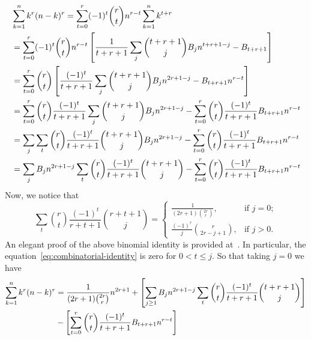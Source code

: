 \begin{equation*}
    \begin{split}
        &\sum_{k=1}^{n} k^{r} (n-k)^{r}
        = \sum_{t=0}^{r} (-1)^t \binom{r}{t} n^{r-t} \sum_{k=1}^{n} k^{t+r} \\
        &= \sum_{t=0}^{r} (-1)^t \binom{r}{t} n^{r-t} \left[ \frac{1}{t+r+1} \sum_{j} \binom{t+r+1}{j} {B}\sb{j} n^{t+r+1-j} - {B}\sb{t+r+1} \right] \\
        &= \sum_{t=0}^{r} \binom{r}{t} \left[ \frac{(-1)^t}{t+r+1} \sum_{j} \binom{t+r+1}{j} {B}\sb{j} n^{2r+1-j} - {B}\sb{t+r+1} n^{r-t} \right] \\
        &= \sum_{t=0}^{r} \binom{r}{t} \frac{(-1)^t}{t+r+1} \sum_{j} \binom{t+r+1}{j} {B}\sb{j} n^{2r+1-j} - \sum_{t=0}^{r} \binom{r}{t} \frac{(-1)^t}{t+r+1} {B}\sb{t+r+1} n^{r-t} \\
        &= \sum_{j} \sum_{t} \binom{r}{t} \frac{(-1)^t}{t+r+1} \binom{t+r+1}{j} {B}\sb{j} n^{2r+1-j} - \sum_{t=0}^{r} \binom{r}{t} \frac{(-1)^t}{t+r+1} {B}\sb{t+r+1} n^{r-t} \\
        &= \sum_{j} {B}\sb{j} n^{2r+1-j} \sum_{t} \binom{r}{t} \frac{(-1)^t}{t+r+1} \binom{t+r+1}{j} - \sum_{t=0}^{r} \binom{r}{t} \frac{(-1)^t}{t+r+1} {B}\sb{t+r+1} n^{r-t}
    \end{split}
\end{equation*}
Now, we notice that
\begin{equation}
    \sum_{t} \binom{r}{t} \frac{(-1)^t}{r+t+1} \binom{r+t+1}{j}
    =\begin{cases}
         \frac{1}{(2r+1) \binom{2r}r}, & \text{if } j=0;\\
         \frac{(-1)^r}{j} \binom{r}{2r-j+1}, & \text{if } j>0.
    \end{cases}\label{eq:combinatorial-identity}
\end{equation}
An elegant proof of the above binomial identity is provided at~\cite{scheuer2023mathstackexchange}.
In particular, the equation~\eqref{eq:combinatorial-identity} is zero for $0< t \leq j$.
So that taking $j=0$ we have
\begin{equation*}
    \begin{split}
        \sum_{k=1}^{n} k^{r} (n-k)^{r}
        &= \frac{1}{(2r+1) \binom{2r}r} n^{2r+1} + \left[ \sum_{j \geq 1} {B}\sb{j} n^{2r+1-j} \sum_{t} \binom{r}{t} \frac{(-1)^t}{t+r+1} \binom{t+r+1}{j} \right] \\
        &- \left[ \sum_{t=0}^{r} \binom{r}{t} \frac{(-1)^t}{t+r+1} {B}\sb{t+r+1} n^{r-t} \right]
    \end{split}
\end{equation*}
